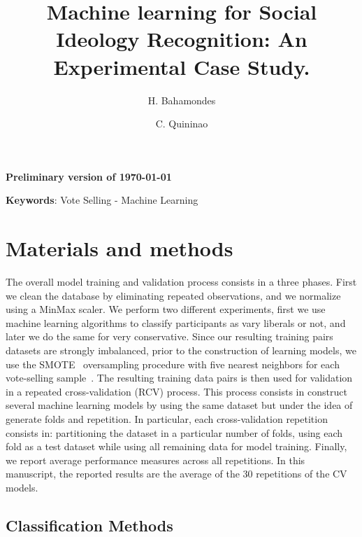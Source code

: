 \documentclass[10pt,leqno]{amsart}
\begin{document}
\title[]{Machine learning for Social Ideology Recognition: An Experimental Case Study.}

\author{H. Bahamondes \and C. Quininao} 

\begin{abstract}

\end{abstract}

\maketitle

 
\begin{center} {\bf Preliminary version of \today}
\end{center}

\bigskip
\textbf{Keywords}: Vote Selling - Machine Learning

\vspace{0.3cm}
\bigskip

\tableofcontents

\section{Materials and methods}

The overall model training and validation process consists in a three phases. First we clean the database by eliminating repeated observations, and we normalize using a MinMax scaler. We perform two different experiments, first we use machine learning algorithms to classify participants as vary liberals or not, and later we do the same for very conservative. Since our resulting training pairs datasets are strongly imbalanced, prior to the construction of learning models, we use the SMOTE~\cite{chawla2002smote} oversampling procedure with five nearest neighbors for each vote-selling sample~\cite{artetxe2020balanced}. The resulting training data pairs is then used for validation in a repeated cross-validation (RCV) process. This process consists in construct several machine learning models by using the same dataset but under the idea of generate folds and repetition. In particular, each cross-validation repetition consists in: partitioning the dataset in a particular number of folds, using each fold as a test dataset while using all remaining data for model training. Finally, we report average performance measures across all repetitions. In this manuscript, the reported results are the average of the 30 repetitions of the CV models.

\subsection{Classification Methods}
\end{document}
